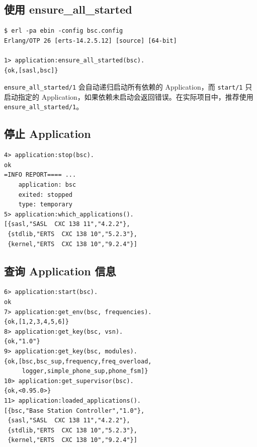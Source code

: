 \documentclass[a4paper,11pt]{article}
\begin{document}
\subsection{使用 ensure\_all\_started}

\begin{lstlisting}[style=shellstyle, caption={使用 ensure\_all\_started 自动启动依赖}]
$ erl -pa ebin -config bsc.config
Erlang/OTP 26 [erts-14.2.5.12] [source] [64-bit]

1> application:ensure_all_started(bsc).
{ok,[sasl,bsc]}
\end{lstlisting}

\begin{tipbox}
\texttt{ensure\_all\_started/1} 会自动递归启动所有依赖的 Application，而 \texttt{start/1} 只启动指定的 Application，如果依赖未启动会返回错误。在实际项目中，推荐使用 \texttt{ensure\_all\_started/1}。
\end{tipbox}

\subsection{停止 Application}

\begin{lstlisting}[style=shellstyle, caption={停止 BSC Application}]
4> application:stop(bsc).
ok
=INFO REPORT==== ...
    application: bsc
    exited: stopped
    type: temporary
5> application:which_applications().
[{sasl,"SASL  CXC 138 11","4.2.2"},
 {stdlib,"ERTS  CXC 138 10","5.2.3"},
 {kernel,"ERTS  CXC 138 10","9.2.4"}]
\end{lstlisting}

\subsection{查询 Application 信息}

\begin{lstlisting}[style=shellstyle, caption={查询 Application 信息}]
6> application:start(bsc).
ok
7> application:get_env(bsc, frequencies).
{ok,[1,2,3,4,5,6]}
8> application:get_key(bsc, vsn).
{ok,"1.0"}
9> application:get_key(bsc, modules).
{ok,[bsc,bsc_sup,frequency,freq_overload,
     logger,simple_phone_sup,phone_fsm]}
10> application:get_supervisor(bsc).
{ok,<0.95.0>}
11> application:loaded_applications().
[{bsc,"Base Station Controller","1.0"},
 {sasl,"SASL  CXC 138 11","4.2.2"},
 {stdlib,"ERTS  CXC 138 10","5.2.3"},
 {kernel,"ERTS  CXC 138 10","9.2.4"}]
\end{lstlisting}
\end{document}
